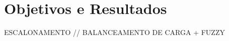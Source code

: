 \chapter{Objetivos e Resultados}
\label{sec:objetivos}
ESCALONAMENTO // BALANCEAMENTO DE CARGA + FUZZY
